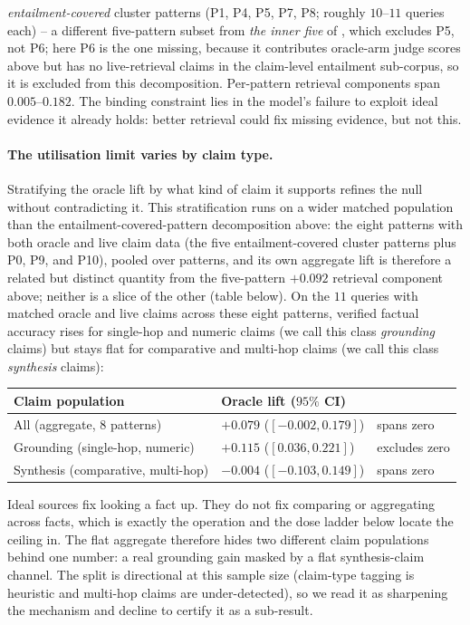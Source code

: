 \documentclass[11pt]{article}
\begin{document}
\emph{entailment-covered} cluster patterns (P1, P4, P5, P7, P8; roughly $10$--$11$ queries each)
-- a different five-pattern subset from \emph{the inner five} of , which
excludes P5, not P6; here P6 is the one missing, because it contributes oracle-arm judge
scores above but has no live-retrieval claims in the claim-level entailment sub-corpus, so it is
excluded from this decomposition. Per-pattern retrieval components span $0.005$--$0.182$. The binding constraint lies in the model's failure to exploit
ideal evidence it already holds: better retrieval could fix missing evidence, but not this.

\paragraph{The utilisation limit varies by claim type.} Stratifying the oracle
lift by what kind of claim it supports refines the null without contradicting it. This
stratification runs on a wider matched population than the entailment-covered-pattern
decomposition
above: the eight patterns with both oracle and live claim data (the five entailment-covered
cluster patterns
plus P0, P9, and P10), pooled over patterns, and its own aggregate lift is therefore a
related but distinct quantity from the five-pattern $+0.092$ retrieval component above;
neither is a slice of the other (table below). On the $11$
queries with matched oracle and live claims across these eight patterns, verified factual accuracy rises for single-hop and
numeric claims (we call this class \emph{grounding} claims) but stays flat for comparative
and multi-hop claims (we call this class \emph{synthesis} claims):
\begin{center}
\small
\begin{tabular}{lll}
\toprule
Claim population & Oracle lift ($95\%$ CI) & \\
\midrule
All (aggregate, $8$ patterns) & $+0.079$ ($[-0.002, 0.179]$) & spans zero \\
Grounding (single-hop, numeric) & $+0.115$ ($[0.036, 0.221]$) & excludes zero \\
Synthesis (comparative, multi-hop) & $-0.004$ ($[-0.103, 0.149]$) & spans zero \\
\bottomrule
\end{tabular}
\end{center}
Ideal
sources fix looking a fact up. They do not fix comparing or aggregating across facts, which is
exactly the operation  and the dose ladder below locate the ceiling in. The
flat aggregate therefore hides two different claim populations behind one
number: a real grounding gain masked by a flat synthesis-claim channel. The split is directional
at this sample size (claim-type tagging is heuristic and multi-hop claims are under-detected), so
we read it as sharpening the mechanism and decline to certify it as a sub-result.
\end{document}
